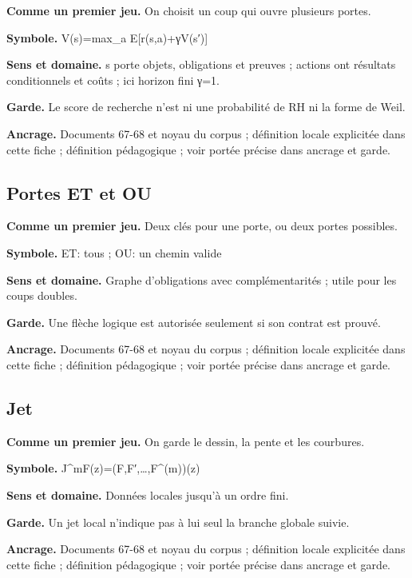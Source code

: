 \documentclass[
  9pt,
  a4paper,
]{article}
\begin{document}
\textbf{Comme un premier jeu.} On choisit un coup qui ouvre plusieurs
portes.

\textbf{Symbole.} V(s)=max\_a E{[}r(s,a)+γV(s′){]}

\textbf{Sens et domaine.} s porte objets, obligations et preuves ;
actions ont résultats conditionnels et coûts ; ici horizon fini γ=1.

\textbf{Garde.} Le score de recherche n'est ni une probabilité de RH ni
la forme de Weil.

\textbf{Ancrage.} Documents 67-68 et noyau du corpus ; définition locale
explicitée dans cette fiche ; définition pédagogique ; voir portée
précise dans ancrage et garde.

\hypertarget{portes-et-et-ou}{%
\subsection{Portes ET et OU}\label{portes-et-et-ou}}

\textbf{Comme un premier jeu.} Deux clés pour une porte, ou deux portes
possibles.

\textbf{Symbole.} ET: tous ; OU: un chemin valide

\textbf{Sens et domaine.} Graphe d'obligations avec complémentarités ;
utile pour les coups doubles.

\textbf{Garde.} Une flèche logique est autorisée seulement si son
contrat est prouvé.

\textbf{Ancrage.} Documents 67-68 et noyau du corpus ; définition locale
explicitée dans cette fiche ; définition pédagogique ; voir portée
précise dans ancrage et garde.

\hypertarget{jet}{%
\subsection{Jet}\label{jet}}

\textbf{Comme un premier jeu.} On garde le dessin, la pente et les
courbures.

\textbf{Symbole.} J\^{}mF(z)=(F,F′,\ldots,F\^{}(m))(z)

\textbf{Sens et domaine.} Données locales jusqu'à un ordre fini.

\textbf{Garde.} Un jet local n'indique pas à lui seul la branche globale
suivie.

\textbf{Ancrage.} Documents 67-68 et noyau du corpus ; définition locale
explicitée dans cette fiche ; définition pédagogique ; voir portée
précise dans ancrage et garde.
\end{document}
